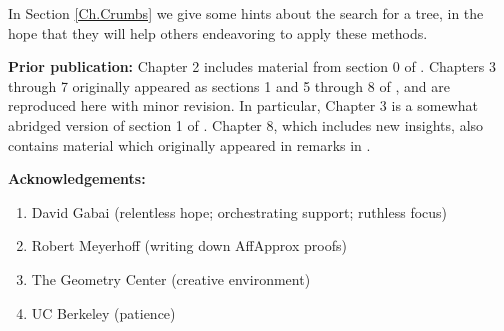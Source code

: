 In Section \ref{Ch.Crumbs} we give some hints about the search for a tree,
in the hope that they will help others endeavoring to apply these methods.
\vskip 8pt

\noindent\textbf {Prior publication:} Chapter 2 includes material from section 0 of \cite{GMT}.
Chapters 3 through 7 originally appeared as sections 1 and 5 through 8 of \cite{GMT},
and are reproduced here with minor revision.  In particular, Chapter 3 is a somewhat abridged version of section 1 of \cite{GMT}.
Chapter 8, which includes new insights, also contains material which originally appeared in remarks in \cite{GMT}.

\vskip 8pt

\noindent\textbf {Acknowledgements:}
\begin{enumerate}
	\item David Gabai (relentless hope; orchestrating support; ruthless focus)
	\item Robert Meyerhoff (writing down AffApprox proofs)
	\item The Geometry Center (creative environment)
	\item UC Berkeley (patience)
\end{enumerate}
